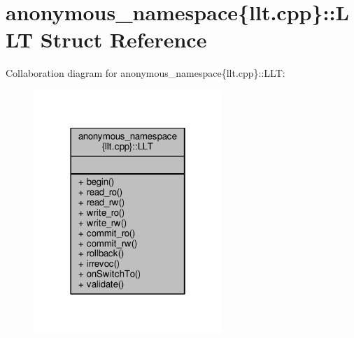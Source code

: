 \hypertarget{structanonymous__namespace_02llt_8cpp_03_1_1LLT}{\section{anonymous\-\_\-namespace\{llt.\-cpp\}\-:\-:L\-L\-T Struct Reference}
\label{structanonymous__namespace_02llt_8cpp_03_1_1LLT}
}


Collaboration diagram for anonymous\-\_\-namespace\{llt.\-cpp\}\-:\-:L\-L\-T\-:
\nopagebreak
\begin{figure}[H]
\begin{center}
\leavevmode
\includegraphics[width=202pt]{structanonymous__namespace_02llt_8cpp_03_1_1LLT__coll__graph}
\end{center}
\end{figure}
